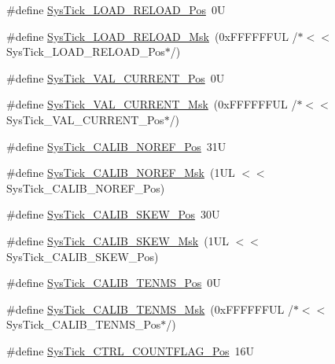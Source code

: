 \begin{DoxyCompactItemize}
\item 
\#define \hyperlink{group___c_m_s_i_s___sys_tick_gaf44d10df359dc5bf5752b0894ae3bad2}{Sys\-Tick\-\_\-\-L\-O\-A\-D\-\_\-\-R\-E\-L\-O\-A\-D\-\_\-\-Pos}~0\-U
\item 
\#define \hyperlink{group___c_m_s_i_s___sys_tick_ga265912a7962f0e1abd170336e579b1b1}{Sys\-Tick\-\_\-\-L\-O\-A\-D\-\_\-\-R\-E\-L\-O\-A\-D\-\_\-\-Msk}~(0x\-F\-F\-F\-F\-F\-F\-U\-L /$\ast$$<$$<$ Sys\-Tick\-\_\-\-L\-O\-A\-D\-\_\-\-R\-E\-L\-O\-A\-D\-\_\-\-Pos$\ast$/)
\item 
\#define \hyperlink{group___c_m_s_i_s___sys_tick_ga3208104c3b019b5de35ae8c21d5c34dd}{Sys\-Tick\-\_\-\-V\-A\-L\-\_\-\-C\-U\-R\-R\-E\-N\-T\-\_\-\-Pos}~0\-U
\item 
\#define \hyperlink{group___c_m_s_i_s___sys_tick_gafc77b56d568930b49a2474debc75ab45}{Sys\-Tick\-\_\-\-V\-A\-L\-\_\-\-C\-U\-R\-R\-E\-N\-T\-\_\-\-Msk}~(0x\-F\-F\-F\-F\-F\-F\-U\-L /$\ast$$<$$<$ Sys\-Tick\-\_\-\-V\-A\-L\-\_\-\-C\-U\-R\-R\-E\-N\-T\-\_\-\-Pos$\ast$/)
\item 
\#define \hyperlink{group___c_m_s_i_s___sys_tick_ga534dbe414e7a46a6ce4c1eca1fbff409}{Sys\-Tick\-\_\-\-C\-A\-L\-I\-B\-\_\-\-N\-O\-R\-E\-F\-\_\-\-Pos}~31\-U
\item 
\#define \hyperlink{group___c_m_s_i_s___sys_tick_ga3af0d891fdd99bcc8d8912d37830edb6}{Sys\-Tick\-\_\-\-C\-A\-L\-I\-B\-\_\-\-N\-O\-R\-E\-F\-\_\-\-Msk}~(1\-U\-L $<$$<$ Sys\-Tick\-\_\-\-C\-A\-L\-I\-B\-\_\-\-N\-O\-R\-E\-F\-\_\-\-Pos)
\item 
\#define \hyperlink{group___c_m_s_i_s___sys_tick_gadd0c9cd6641b9f6a0c618e7982954860}{Sys\-Tick\-\_\-\-C\-A\-L\-I\-B\-\_\-\-S\-K\-E\-W\-\_\-\-Pos}~30\-U
\item 
\#define \hyperlink{group___c_m_s_i_s___sys_tick_ga8a6a85a87334776f33d77fd147587431}{Sys\-Tick\-\_\-\-C\-A\-L\-I\-B\-\_\-\-S\-K\-E\-W\-\_\-\-Msk}~(1\-U\-L $<$$<$ Sys\-Tick\-\_\-\-C\-A\-L\-I\-B\-\_\-\-S\-K\-E\-W\-\_\-\-Pos)
\item 
\#define \hyperlink{group___c_m_s_i_s___sys_tick_gacae558f6e75a0bed5d826f606d8e695e}{Sys\-Tick\-\_\-\-C\-A\-L\-I\-B\-\_\-\-T\-E\-N\-M\-S\-\_\-\-Pos}~0\-U
\item 
\#define \hyperlink{group___c_m_s_i_s___sys_tick_gaf1e68865c5aece2ad58971225bd3e95e}{Sys\-Tick\-\_\-\-C\-A\-L\-I\-B\-\_\-\-T\-E\-N\-M\-S\-\_\-\-Msk}~(0x\-F\-F\-F\-F\-F\-F\-U\-L /$\ast$$<$$<$ Sys\-Tick\-\_\-\-C\-A\-L\-I\-B\-\_\-\-T\-E\-N\-M\-S\-\_\-\-Pos$\ast$/)
\item 
\#define \hyperlink{group___c_m_s_i_s___sys_tick_gadbb65d4a815759649db41df216ed4d60}{Sys\-Tick\-\_\-\-C\-T\-R\-L\-\_\-\-C\-O\-U\-N\-T\-F\-L\-A\-G\-\_\-\-Pos}~16\-U

\end{DoxyCompactItemize}
